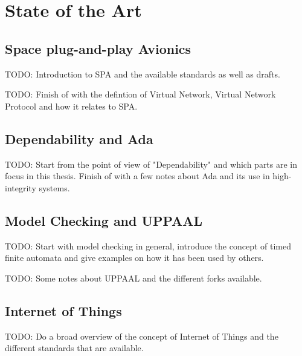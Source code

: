 \chapter{State of the Art}

\section{Space plug-and-play Avionics}
TODO: Introduction to SPA and the available standards as well as drafts.

TODO: Finish of with the defintion of Virtual Network, Virtual Network
Protocol and how it relates to SPA.

\section{Dependability and Ada}
TODO: Start from the point of view of "Dependability" and which parts are in
focus in this thesis. Finish of with a few notes about Ada and its use in
high-integrity systems.

\section{Model Checking and UPPAAL}
TODO: Start with model checking in general, introduce the concept of timed
finite automata and give examples on how it has been used by others.

TODO: Some notes about UPPAAL and the different forks available.

\section{Internet of Things}
TODO: Do a broad overview of the concept of Internet of Things and the
different standards that are available.
